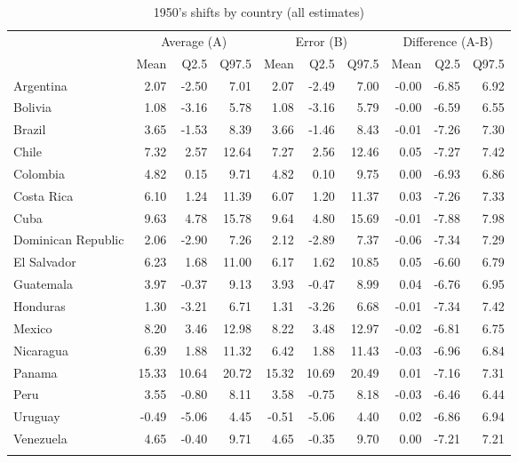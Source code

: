 \renewcommand{\arraystretch}{1.2}
\setlength{\tabcolsep}{10pt}
\begin{table}[htp]
\centering
\caption{1950's shifts by country (all estimates)} 
\label{tab:shift_1950_selected}
\scriptsize
\begin{tabular}{lrrrrrrrrr}
  \hline
  \addlinespace
    & \multicolumn{3}{c}{Average (A)}  & \multicolumn{3}{c}{Error (B)} & \multicolumn{3}{c}{Difference (A-B)}  \\
    \cmidrule(lr){2-4}\cmidrule(lr){5-7}\cmidrule(lr){8-10}
 & Mean & Q2.5 & Q97.5 & Mean & Q2.5 & Q97.5 & Mean & Q2.5 & Q97.5 \\ 
 \addlinespace
  \hline
\addlinespace 
Argentina & 2.07 & -2.50 & 7.01 & 2.07 & -2.49 & 7.00 & -0.00 & -6.85 & 6.92 \\ 
  Bolivia & 1.08 & -3.16 & 5.78 & 1.08 & -3.16 & 5.79 & -0.00 & -6.59 & 6.55 \\ 
  Brazil & 3.65 & -1.53 & 8.39 & 3.66 & -1.46 & 8.43 & -0.01 & -7.26 & 7.30 \\ 
  Chile & 7.32 & 2.57 & 12.64 & 7.27 & 2.56 & 12.46 & 0.05 & -7.27 & 7.42 \\ 
  Colombia & 4.82 & 0.15 & 9.71 & 4.82 & 0.10 & 9.75 & 0.00 & -6.93 & 6.86 \\ 
  Costa Rica & 6.10 & 1.24 & 11.39 & 6.07 & 1.20 & 11.37 & 0.03 & -7.26 & 7.33 \\ 
  Cuba & 9.63 & 4.78 & 15.78 & 9.64 & 4.80 & 15.69 & -0.01 & -7.88 & 7.98 \\ 
  Dominican Republic & 2.06 & -2.90 & 7.26 & 2.12 & -2.89 & 7.37 & -0.06 & -7.34 & 7.29 \\ 
  El Salvador & 6.23 & 1.68 & 11.00 & 6.17 & 1.62 & 10.85 & 0.05 & -6.60 & 6.79 \\ 
  Guatemala & 3.97 & -0.37 & 9.13 & 3.93 & -0.47 & 8.99 & 0.04 & -6.76 & 6.95 \\ 
  Honduras & 1.30 & -3.21 & 6.71 & 1.31 & -3.26 & 6.68 & -0.01 & -7.34 & 7.42 \\ 
  Mexico & 8.20 & 3.46 & 12.98 & 8.22 & 3.48 & 12.97 & -0.02 & -6.81 & 6.75 \\ 
  Nicaragua & 6.39 & 1.88 & 11.32 & 6.42 & 1.88 & 11.43 & -0.03 & -6.96 & 6.84 \\ 
  Panama & 15.33 & 10.64 & 20.72 & 15.32 & 10.69 & 20.49 & 0.01 & -7.16 & 7.31 \\ 
  Peru & 3.55 & -0.80 & 8.11 & 3.58 & -0.75 & 8.18 & -0.03 & -6.46 & 6.44 \\ 
  Uruguay & -0.49 & -5.06 & 4.45 & -0.51 & -5.06 & 4.40 & 0.02 & -6.86 & 6.94 \\ 
  Venezuela & 4.65 & -0.40 & 9.71 & 4.65 & -0.35 & 9.70 & 0.00 & -7.21 & 7.21 \\ 
    \addlinespace
\hline
\end{tabular}
\end{table}
